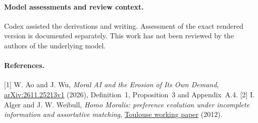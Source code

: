 \documentclass[11pt]{article}
\begin{document}
\paragraph{Model assessments and review context.} Codex assisted the derivations and writing. Assessment of the exact rendered version is documented separately. This work has not been reviewed by the authors of the underlying model.
\paragraph{References.} [1] W. Ao and J. Wu, \emph{Moral AI and the Erosion of Its Own Demand}, \href{https://arxiv.org/abs/2611.25213v1}{arXiv:2611.25213v1} (2026), Definition~1, Proposition~3 and Appendix~A.4.
[2] I. Alger and J. W. Weibull, \emph{Homo Moralis: preference evolution under incomplete information and assortative matching}, \href{https://publications.ut-capitole.fr/id/eprint/16435/1/12.03.360.pdf}{Toulouse working paper} (2012).
\end{document}

